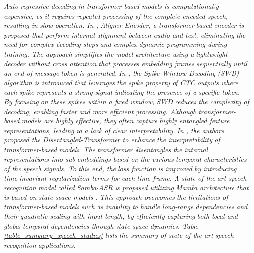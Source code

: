 \documentclass[preprint,12pt]{elsarticle}
\begin{document}
\emph{Auto-regressive decoding in transformer-based models is computationally expensive, as it requires repeated processing of the complete encoded speech, resulting in slow operation. In \citep{stooke_aligner-encoders_2025}, Aligner-Encoder, a transformer-based encoder is proposed that perform internal alignment between audio and text, eliminating the need for complex decoding steps and complex dynamic programming during training. The approach simplifies the model architecture using a lightweight decoder without cross attention that processes embedding frames sequentially until an end-of-message token is generated. In \citep{zhang_breaking_2025}, the Spike Window Decoding (SWD) algorithm is introduced that leverages the spike property of CTC outputs where each spike represents a strong signal indicating the presence of a specific token. By focusing on these spikes within a fixed window, SWD reduces the complexity of decoding, enabling faster and more efficient processing. Although transformer-based models are highly effective, they often capture highly entangled feature representations, leading to a lack of clear interpretability. In \citep{wang_disentangled-transformer_2024}, the authors proposed the Disentangled-Transformer to enhance the interpretability of transformer-based models. The transformer disentangles the internal representations into sub-embeddings based on the various temporal characteristics of the speech signals. To this end, the loss function is improved by introducing time-invariant regularization terms for each time frame. A state-of-the-art speech recognition model called Samba-ASR is proposed utilizing Mamba architecture that is based on state-space-models \citep{shakhadri_samba-asr_2025}. This approach overcomes the limitations of transformer-based models such as inability to handle long-range dependencies and their quadratic scaling with input length, by efficiently capturing both local and global temporal dependencies through state-space-dynamics. Table \ref{table_summary_speech_studies} lists the summary of state-of-the-art speech recognition applications.}
\end{document}
